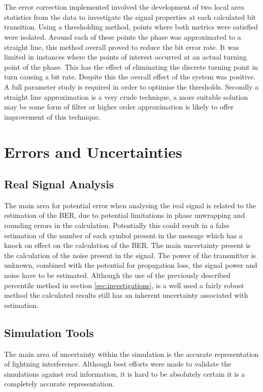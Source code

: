 \\\\
The error correction implemented involved the development of two local area statistics from the data to investigate the signal properties at each calculated bit transition. Using a thresholding method, points where both metrics were satisfied were isolated. Around each of these points the phase was approximated to a straight line, this method overall proved to reduce the bit error rate. It was limited in instances where the points of interest occurred at an actual turning point of the phase. This has the effect of eliminating the discrete turning point in turn causing a bit rate. Despite this the overall effect of the system was positive. A full parameter study is required in order to optimise the thresholds. Secondly a straight line approximation is a very crude technique, a more suitable solution may be some form of filter or higher order approximation is likely to offer improvement of this technique.    

\section{Errors and Uncertainties}
\subsection{Real Signal Analysis}
The main area for potential error when analysing the real signal is related to the estimation of the BER, due to potential limitations in phase unwrapping and rounding errors in the calculation. Potentially this could result in a false estimation of the number of each symbol present in the message which has a knock on effect on the calculation of the BER. The main uncertainty present is the calculation of the noise present in the signal. The power of the transmitter is unknown, combined with the potential for propagation loss, the signal power and noise have to be estimated. Although the use of the previously described percentile method in section \ref{sec:investigations}, is a well used a fairly robust method the calculated results still has an inherent uncertainty associated with estimation.
\subsection{Simulation Tools}
The main area of uncertainty within the simulation is the accurate representation of lightning interference. Although best efforts were made to validate the simulations against real information, it is hard to be absolutely certain it is a completely accurate representation.
